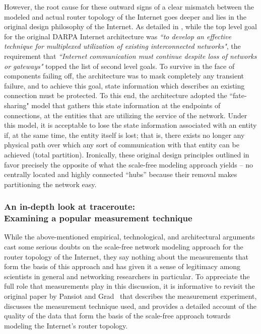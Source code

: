 However, the root cause for these outward signs of a clear mismatch
between the modeled and actual
router topology of the Internet goes deeper and lies in the original design philosophy of the
Internet.  As detailed in \cite{clarke95:_design}, while the top level goal for the original DARPA Internet architecture was {\it ``to develop an effective technique for multiplexed utilization
of existing interconnected networks"}, the requirement that {\it ``Internet communication must
continue despite loss of networks or gateways"} topped the list of second level goals. To survive
in the face of components failing off, the architecture was to mask completely any transient 
failure, and to achieve this goal, state information which describes an existing connection must
be protected. To this end, the architecture adopted the ``fate-sharing" model that gathers this 
state information at the endpoints of connections, at the entities that are utilizing the 
service of the network. Under this model, it is acceptable to lose the state information 
associated with an entity if, at the same time, the entity itself is lost; that is, there 
exists no longer any physical path over which any sort of communication with that entity can
be achieved (\ie total partition). Ironically, these original design principles
outlined in \cite{clarke95:_design} favor precisely the opposite of what the scale-free modeling approach
yields -- no centrally located and highly connected ``hubs'' because their removal makes
partitioning the network easy.


\subsubsection{An in-depth look at traceroute: \\ Examining a popular measurement technique}
\label{sec:mpls}

While the above-mentioned empirical, technological, and architectural
arguments cast some serious doubts on the scale-free network modeling
approach for the router topology of the Internet, they say nothing
about the measurements that form the basis of this approach and has
given it a sense of legitimacy among scientists in general and
networking researchers in particular.  To appreciate the full role
that measurements play in this discussion, it is informative to
revisit the original paper by Pansiot and Grad~\cite{pansiot98:_inter}
that describes the measurement experiment, discusses the measurement
technique used, and provides a detailed account of the quality of the
data that form the basis of the scale-free approach towards modeling
the Internet's router topology.

